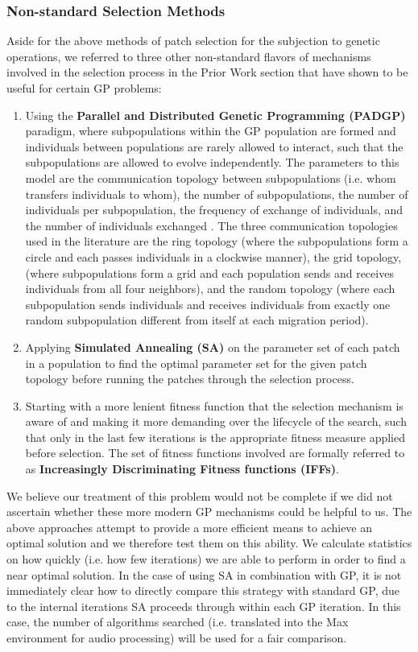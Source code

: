 \documentclass[a4paper,12pt]{report} 	%
\numberwithin{figure}{chapter}
\numberwithin{table}{chapter}
\numberwithin{equation}{chapter}
\begin{document}
\begin{flushleft}
\subsubsection{Non-standard Selection Methods}

Aside for the above methods of patch selection for the subjection to genetic operations, we referred to three other non-standard flavors of mechanisms involved in the selection process in the Prior Work section that have shown to be useful for certain GP problems:

\begin{enumerate}
\item Using the \textbf{Parallel and Distributed Genetic Programming (PADGP)} paradigm, where subpopulations within the GP population are formed and individuals between populations are rarely allowed to interact, such that the subpopulations are allowed to evolve independently. The parameters to this model are the communication topology between subpopulations (i.e. whom transfers individuals to whom), the number of subpopulations, the number of individuals per subpopulation, the frequency of exchange of individuals, and the number of individuals exchanged \cite[p. 178]{Vanneschi:2004le}. The three communication topologies used in the literature are the ring topology (where the subpopulations form a circle and each passes individuals in a clockwise manner), the grid topology, (where subpopulations form a grid and each population sends and receives individuals from all four neighbors), and the random topology (where each subpopulation sends individuals and receives individuals from exactly one random subpopulation different from itself at each migration period).
\item Applying \textbf{Simulated Annealing (SA)} on the parameter set of each patch in a population to find the optimal parameter set for the given patch topology before running the patches through the selection process.  
\item Starting with a more lenient fitness function that the selection mechanism is aware of and making it more demanding over the lifecycle of the search, such that only in the last few iterations is the appropriate fitness measure applied before selection. The set of fitness functions involved are formally referred to as \textbf{Increasingly Discriminating Fitness functions (IFFs)}. 
\end{enumerate}

We believe our treatment of this problem would not be complete if we did not ascertain whether these more modern GP mechanisms could be helpful to us. The above approaches attempt to provide a more efficient means to achieve an optimal solution and we therefore test them on this ability. We calculate statistics on how quickly (i.e. how few iterations) we are able to perform in order to find a near optimal solution. In the case of using SA in combination with GP, it is not immediately clear how to directly compare this strategy with standard GP, due to the internal iterations SA proceeds through within each GP iteration. In this case, the number of algorithms searched (i.e. translated into the Max environment for audio processing) will be used for a fair comparison.


\end{flushleft}
\end{document}
